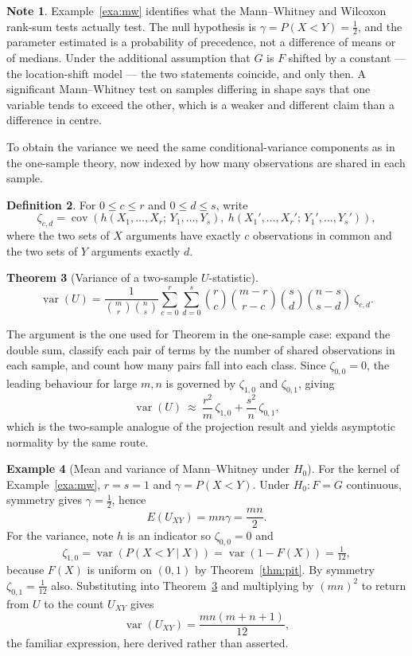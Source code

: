 \documentclass[12pt,a4paper]{report}
\theoremstyle{definition}
\newtheorem{thm}{Theorem}[section]
\newtheorem{defn}[thm]{Definition}
\newtheorem{exa}[thm]{Example}
\newtheorem{note}[thm]{Note}
\theoremstyle{plain}
\begin{document}
\begin{note}
Example~\ref{exa:mw} identifies what the Mann--Whitney and Wilcoxon rank-sum
tests actually test. The null hypothesis is $\gamma = P(X<Y) = \tfrac12$, and
the parameter estimated is a probability of precedence, not a difference of
means or of medians. Under the additional assumption that $G$ is $F$ shifted by
a constant --- the location-shift model --- the two statements coincide, and
only then. A significant Mann--Whitney test on samples differing in shape says
that one variable tends to exceed the other, which is a weaker and different
claim than a difference in centre.
\end{note}

To obtain the variance we need the same conditional-variance components as in
the one-sample theory, now indexed by how many observations are shared in each
sample.

\begin{defn}
For $0\leq c\leq r$ and $0\leq d\leq s$, write
$$\zeta_{c,d} = \operatorname{cov}\left(
h(X_1,\dots,X_r;\,Y_1,\dots,Y_s),\
h(X_1',\dots,X_r';\,Y_1',\dots,Y_s')\right),$$
where the two sets of $X$ arguments have exactly $c$ observations in common and
the two sets of $Y$ arguments exactly $d$.
\end{defn}

\begin{thm}[Variance of a two-sample $U$-statistic]
\label{thm:var2}
$$\operatorname{var}(U) = \frac{1}{\binom{m}{r}\binom{n}{s}}
\sum^{r}_{c=0}\sum^{s}_{d=0}
\binom{r}{c}\binom{m-r}{r-c}\binom{s}{d}\binom{n-s}{s-d}\ \zeta_{c,d} .$$
\end{thm}

The argument is the one used for Theorem in the one-sample case: expand the
double sum, classify each pair of terms by the number of shared observations in
each sample, and count how many pairs fall into each class. Since
$\zeta_{0,0}=0$, the leading behaviour for large $m,n$ is governed by
$\zeta_{1,0}$ and $\zeta_{0,1}$, giving
$$\operatorname{var}(U)\ \approx\ \frac{r^{2}}{m}\,\zeta_{1,0}
+ \frac{s^{2}}{n}\,\zeta_{0,1} ,$$
which is the two-sample analogue of the projection result and yields asymptotic
normality by the same route.

\begin{exa}[Mean and variance of Mann--Whitney under $H_0$]
For the kernel of Example~\ref{exa:mw}, $r=s=1$ and $\gamma = P(X<Y)$. Under
$H_0: F=G$ continuous, symmetry gives $\gamma = \tfrac12$, hence
$$E\left(U_{XY}\right) = mn\gamma = \frac{mn}{2}.$$
For the variance, note $h$ is an indicator so
$\zeta_{0,0}=0$ and
$$\zeta_{1,0} = \operatorname{var}\left(P(X<Y\mid X)\right)
= \operatorname{var}\left(1-F(X)\right) = \tfrac{1}{12},$$
because $F(X)$ is uniform on $(0,1)$ by Theorem~\ref{thm:pit}. By symmetry
$\zeta_{0,1}=\tfrac{1}{12}$ also. Substituting into
Theorem~\ref{thm:var2} and multiplying by $(mn)^2$ to return from $U$ to the
count $U_{XY}$ gives
$$\operatorname{var}\left(U_{XY}\right) = \frac{mn(m+n+1)}{12},$$
the familiar expression, here derived rather than asserted.
\end{exa}
\end{document}
